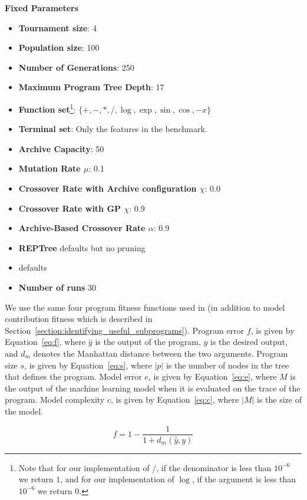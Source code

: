 \textbf{Fixed Parameters}\label{appendix:fixed_parameters}
\begin{itemize}
\item \textbf{Tournament size}: 4
\item \textbf{Population size}: 100
\item \textbf{Number of Generations}: 250
\item \textbf{Maximum Program Tree Depth}: 17
\item \textbf{Function set}\footnote{Note that for our implementation of $/$, if the denominator is less than $10^{-6}$ we return $1$, and for our implementation of $\log$, if the argument is less than $10^{-6}$ we return $0$.}: $\{ +, -, *, /, \log, \exp, \sin, \cos, -x \}$
\item \textbf{Terminal set}: Only the features in the benchmark.
\item \textbf{Archive Capacity}: 50
\item \textbf{Mutation Rate $\mu$}: 0.1
\item \textbf{Crossover Rate with Archive configuration $\chi$}: 0.0
\item \textbf{Crossover Rate with GP $\chi$}: 0.9
\item \textbf{Archive-Based Crossover Rate $\alpha$}: 0.9
\item \textbf{REPTree}  defaults but no pruning
\item \textbf{\SCIKIT} defaults
\item \textbf{Number of runs} 30
\end{itemize}

We use the same four program fitness functions used in \cite{krawiecGecco2014} (in addition to model contribution fitness which is described in Section~\ref{section:identifying_useful_subprograms}). Program error $f$, is given by Equation~\ref{eq:f}, where $\hat y$ is the output of the program, $y$ is the desired output, and $d_{m}$ denotes the Manhattan distance between the two arguments.  Program size $s$, is given by Equation~\ref{eq:s}, where $|p|$ is the number of nodes in the tree that defines the program. Model error $e$, is given by Equation~\ref{eq:e}, where $M$ is the output of the machine learning model when it is evaluated on the trace of the program. Model complexity $c$, is given by Equation~\ref{eq:c}, where $|M|$ is the size of the model.

\begin{equation}
\label{eq:f}
f = 1 - \frac{1}{1 + d_{m}(\hat y, y)}
\end{equation}

